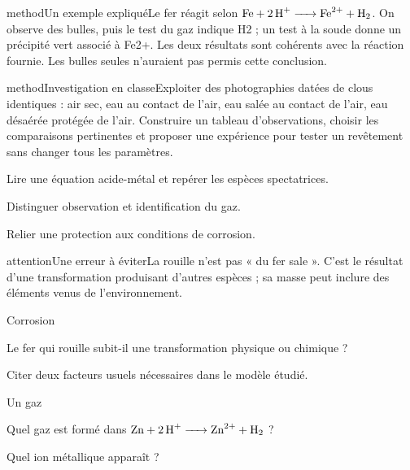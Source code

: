 \begin{pcEncadre}{method}{Un exemple expliqué}Le fer réagit selon $\ce{Fe + 2 H+ -> Fe^{2+} + H2}$. On observe des bulles, puis le test du gaz indique H2 ; un test à la soude donne un précipité vert associé à Fe2+. Les deux résultats sont cohérents avec la réaction fournie. Les bulles seules n’auraient pas permis cette conclusion.\end{pcEncadre}
\label{activite-5}
\begin{pcEncadre}{method}{Investigation en classe}Exploiter des photographies datées de clous identiques : air sec, eau au contact de l’air, eau salée au contact de l’air, eau désaérée protégée de l’air. Construire un tableau d’observations, choisir les comparaisons pertinentes et proposer une expérience pour tester un revêtement sans changer tous les paramètres.\end{pcEncadre}
\begin{questions}
\item Lire une équation acide-métal et repérer les espèces spectatrices.
\item Distinguer observation et identification du gaz.
\item Relier une protection aux conditions de corrosion.
\end{questions}
\begin{pcEncadre}{attention}{Une erreur à éviter}La rouille n’est pas « du fer sale ». C’est le résultat d’une transformation produisant d’autres espèces ; sa masse peut inclure des éléments venus de l’environnement.\end{pcEncadre}
\pcGrille
\clearpage{}
\par\noindent\begin{minipage}{\linewidth}
\begin{exercice}[1]{Corrosion}
\begin{questions}
\item Le fer qui rouille subit-il une transformation physique ou chimique ?
\item Citer deux facteurs usuels nécessaires dans le modèle étudié.
\end{questions}
\end{exercice}
\end{minipage}
\par\noindent\begin{minipage}{\linewidth}
\begin{exercice}[1]{Un gaz}
\begin{questions}
\item Quel gaz est formé dans $\ce{Zn + 2 H+ -> Zn^{2+} + H2}$ ?
\item Quel ion métallique apparaît ?
\end{questions}
\end{exercice}
\end{minipage}
